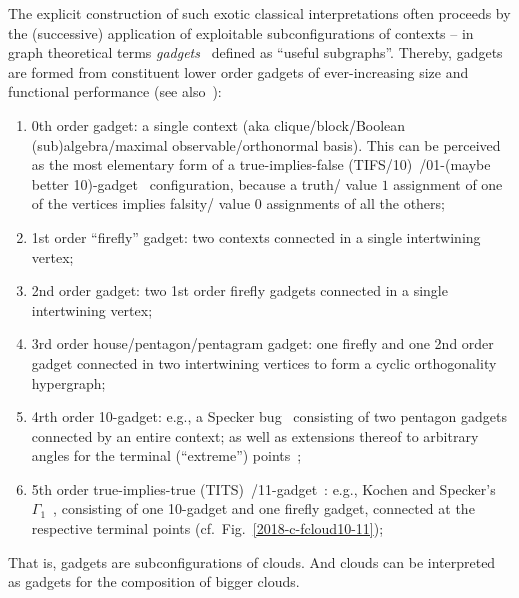 \documentclass[%
  reprint,
  twocolumn,
 showpacs,
 showkeys,
 preprintnumbers,
 amsmath,amssymb,
 aps,
  prl,
  longbibliography,
 ]{revtex4-1}
\begin{document}
The explicit construction of such exotic classical interpretations
often proceeds by the (successive) application of exploitable subconfigurations of contexts
-- in graph theoretical terms {\em gadgets}~\cite{tutte_1954,SZABO2009436,Ramanathan-18} defined as ``useful subgraphs''.
Thereby, gadgets are formed from constituent lower order gadgets of ever-increasing size and functional performance
(see also~\cite[Chapter~12]{svozil-2016-pu-book}):
\begin{enumerate}

\item 0th order gadget:  a single context (aka clique/block/Boolean (sub)algebra/maximal observable/orthonormal basis).
This can be perceived as the most elementary form of a
true-implies-false (TIFS/10)~\cite{2018-minimalYIYS}/01-(maybe better 10)-gadget~\cite{svozil-2006-omni,Ramanathan-18}
configuration, because a truth/ value $1$ assignment of one of the vertices implies falsity/ value 0 assignments of all the others;

\item 1st order ``firefly'' gadget: two contexts connected in a single intertwining vertex;

\item 2nd order gadget:  two 1st order  firefly  gadgets connected in a single intertwining vertex;

\item 3rd order house/pentagon/pentagram gadget:  one firefly and one 2nd order gadget connected in two intertwining vertices to form a cyclic orthogonality hypergraph;

\item 4rth order 10-gadget:  e.g., a Specker bug~\cite{2018-minimalYIYS} consisting of two pentagon gadgets connected by an entire context;
as well as extensions thereof to arbitrary angles for the terminal (``extreme'') points~\cite{2015-AnalyticKS,Ramanathan-18};

\item 5th order  true-implies-true (TITS)~\cite{2018-minimalYIYS}/11-gadget~\cite{svozil-2006-omni}:  e.g.,  Kochen and Specker's $\Gamma_1$~\cite{kochen1}, consisting of one 10-gadget and one firefly gadget,
connected at the respective terminal points (cf.~Fig.~\ref{2018-c-fcloud10-11});

%
%
\end{enumerate}
That is, gadgets are subconfigurations of clouds. And clouds can be interpreted as gadgets for the composition of bigger clouds.
\end{document}
